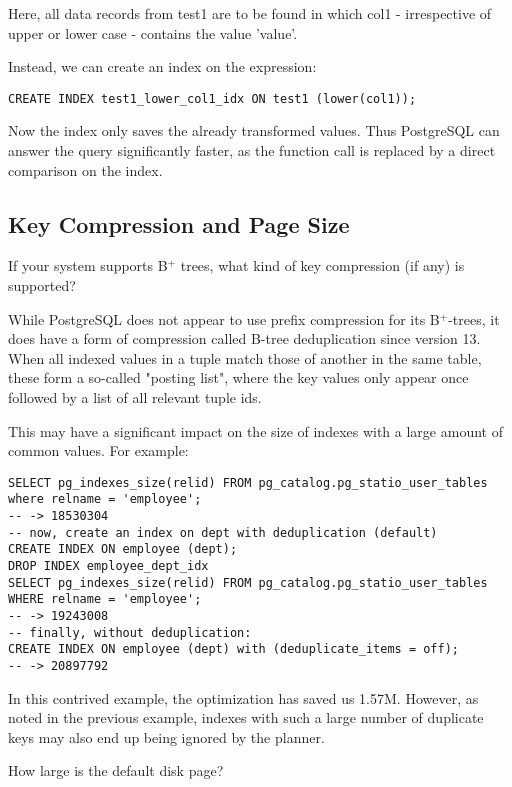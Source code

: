\documentclass[11pt]{scrartcl}
\begin{document}
Here, all data records from test1 are to be found in which col1 - irrespective of upper or lower case - contains the value 'value'.

Instead, we can create an index on the expression:

\begin{lstlisting}[style=dbtsql]
CREATE INDEX test1_lower_col1_idx ON test1 (lower(col1));
\end{lstlisting}

Now the index only saves the already transformed values. Thus PostgreSQL can answer the query significantly faster, as the function call is replaced by a direct comparison on the index.

\subsection{Key Compression and Page Size}

If your system supports B$^+$ trees, what kind of key compression (if any) is supported?

While PostgreSQL does not appear to use prefix compression for its B$^+$-trees, it does have a form of compression called B-tree deduplication since version 13.  When all indexed values in a tuple match those of another in the same table, these form a so-called "posting list", where the key values only appear once followed by a list of all relevant tuple ids.

This may have a significant impact on the size of indexes with a large amount of common values.  For example:

\begin{lstlisting}[style=dbtsql]
SELECT pg_indexes_size(relid) FROM pg_catalog.pg_statio_user_tables where relname = 'employee';
-- -> 18530304
-- now, create an index on dept with deduplication (default)
CREATE INDEX ON employee (dept);
DROP INDEX employee_dept_idx
SELECT pg_indexes_size(relid) FROM pg_catalog.pg_statio_user_tables WHERE relname = 'employee';
-- -> 19243008
-- finally, without deduplication:
CREATE INDEX ON employee (dept) with (deduplicate_items = off);
-- -> 20897792
\end{lstlisting}

In this contrived example, the optimization has saved us 1.57M.  However, as noted in the previous example, indexes with such a large number of duplicate keys may also end up being ignored by the planner.

How large is the default disk page?
\end{document}
